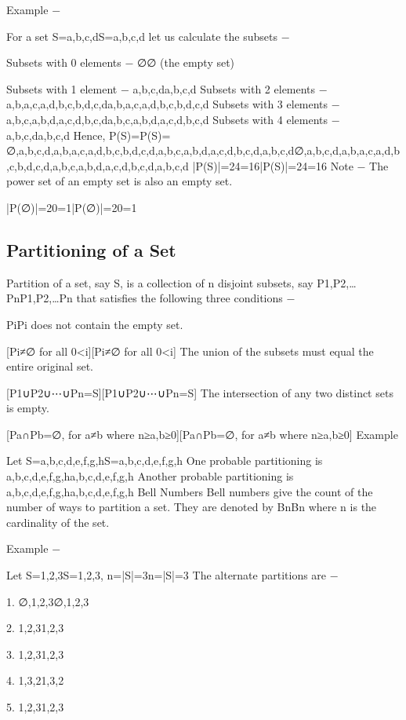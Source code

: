 \documentclass[12pt]{article}
\begin{document}
{Example −

For a set S={a,b,c,d}S={a,b,c,d} let us calculate the subsets −

Subsets with 0 elements − {∅}{∅} (the empty set)

Subsets with 1 element − {a},{b},{c},{d}{a},{b},{c},{d}
Subsets with 2 elements − {a,b},{a,c},{a,d},{b,c},{b,d},{c,d}{a,b},{a,c},{a,d},{b,c},{b,d},{c,d}
Subsets with 3 elements − {a,b,c},{a,b,d},{a,c,d},{b,c,d}{a,b,c},{a,b,d},{a,c,d},{b,c,d}
Subsets with 4 elements − {a,b,c,d}{a,b,c,d}
Hence, P(S)=P(S)=
{{∅},{a},{b},{c},{d},{a,b},{a,c},{a,d},{b,c},{b,d},{c,d},{a,b,c},{a,b,d},{a,c,d},{b,c,d},{a,b,c,d}}{{∅},{a},{b},{c},{d},{a,b},{a,c},{a,d},{b,c},{b,d},{c,d},{a,b,c},{a,b,d},{a,c,d},{b,c,d},{a,b,c,d}}
|P(S)|=24=16|P(S)|=24=16
Note − The power set of an empty set is also an empty set.

|P({∅})|=20=1|P({∅})|=20=1
\subsection{Partitioning of a Set}
Partition of a set, say S, is a collection of n disjoint subsets, say P1,P2,…PnP1,P2,…Pn that satisfies the following three conditions −

PiPi does not contain the empty set.

[Pi≠{∅} for all 0<i\leqn][Pi≠{∅} for all 0<i\leqn]
The union of the subsets must equal the entire original set.

[P1∪P2∪⋯∪Pn=S][P1∪P2∪⋯∪Pn=S]
The intersection of any two distinct sets is empty.

[Pa∩Pb={∅}, for a≠b where n≥a,b≥0][Pa∩Pb={∅}, for a≠b where n≥a,b≥0]
Example

Let S={a,b,c,d,e,f,g,h}S={a,b,c,d,e,f,g,h}
One probable partitioning is {a},{b,c,d},{e,f,g,h}{a},{b,c,d},{e,f,g,h}
Another probable partitioning is {a,b},{c,d},{e,f,g,h}{a,b},{c,d},{e,f,g,h}
Bell Numbers
Bell numbers give the count of the number of ways to partition a set. They are denoted by BnBn where n is the cardinality of the set.

Example −

Let S={1,2,3}S={1,2,3}, n=|S|=3n=|S|=3
The alternate partitions are −

1. ∅,{1,2,3}∅,{1,2,3}

2. {1},{2,3}{1},{2,3}

3. {1,2},{3}{1,2},{3}

4. {1,3},{2}{1,3},{2}

5. {1},{2},{3}{1},{2},{3}

}
\end{document}
